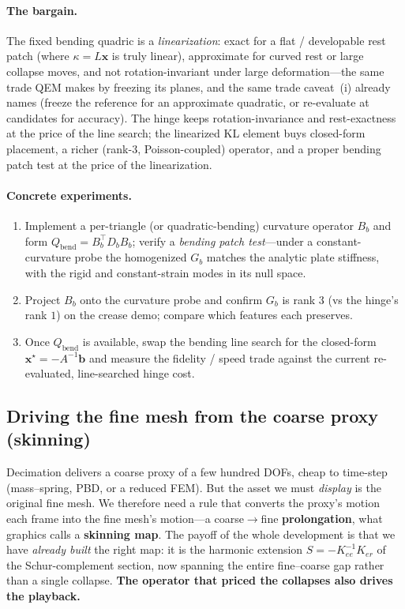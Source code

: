 \paragraph{The bargain.}
The fixed bending quadric is a \emph{linearization}: exact for a flat / developable rest patch (where $\kappa=L\mathbf x$ is truly linear), approximate for curved rest or large collapse moves, and not rotation-invariant under large deformation---the same trade QEM makes by freezing its planes, and the same trade caveat~(i) already names (freeze the reference for an approximate quadratic, or re-evaluate at candidates for accuracy).
The hinge keeps rotation-invariance and rest-exactness at the price of the line search; the linearized KL element buys closed-form placement, a richer (rank-3, Poisson-coupled) operator, and a proper bending patch test at the price of the linearization.

\paragraph{Concrete experiments.}
\begin{enumerate}
  \item Implement a per-triangle (or quadratic-bending) curvature operator $B_b$ and form $Q_{\text{bend}}=B_b^\top D_b B_b$; verify a \emph{bending patch test}---under a constant-curvature probe the homogenized $G_b$ matches the analytic plate stiffness, with the rigid and constant-strain modes in its null space.
  \item Project $B_b$ onto the curvature probe and confirm $G_b$ is rank $3$ (vs the hinge's rank $1$) on the crease demo; compare which features each preserves.
  \item Once $Q_{\text{bend}}$ is available, swap the bending line search for the closed-form $\mathbf x^\star=-A^{-1}\mathbf b$ and measure the fidelity / speed trade against the current re-evaluated, line-searched hinge cost.
\end{enumerate}


\subsection{Driving the fine mesh from the coarse proxy (skinning)}

Decimation delivers a coarse proxy of a few hundred DOFs, cheap to time-step (mass--spring, PBD, or a reduced FEM).
But the asset we must \emph{display} is the original fine mesh.
We therefore need a rule that converts the proxy's motion each frame into the fine mesh's motion---a coarse$\to$fine \textbf{prolongation}, what graphics calls a \textbf{skinning map}.
The payoff of the whole development is that we have \emph{already built} the right map: it is the harmonic extension $S=-K_{ee}^{-1}K_{er}$ of the Schur-complement section, now spanning the entire fine--coarse gap rather than a single collapse.
\textbf{The operator that priced the collapses also drives the playback.}

